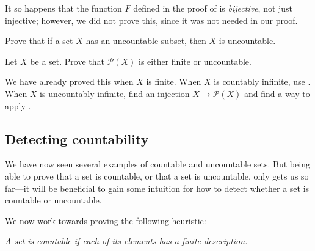 It so happens that the function $F$ defined in the proof of  is \textit{bijective}, not just injective; however, we did not prove this, since it was not needed in our proof.

\begin{exercise}
Prove that if a set $X$ has an uncountable subset, then $X$ is uncountable.
\end{exercise}

\begin{exercise}
\label{exPowerSetFiniteOrUncountable}
Let $X$ be a set. Prove that $\mathcal{P}(X)$ is either finite or uncountable.
\begin{backhint}
We have already proved this when $X$ is finite. When $X$ is countably infinite, use . When $X$ is uncountably infinite, find an injection $X \to \mathcal{P}(X)$ and find a way to apply .
\end{backhint}
\end{exercise}

\subsection*{Detecting countability}

We have now seen several examples of countable and uncountable sets. But being able to prove that a set is countable, or that a set is uncountable, only gets us so far---it will be beneficial to gain some intuition for how to detect whether a set is countable or uncountable.

We now work towards proving the following heuristic:

\begin{center}
\textit{A set is countable if each of its elements has a finite description.}
\end{center}

